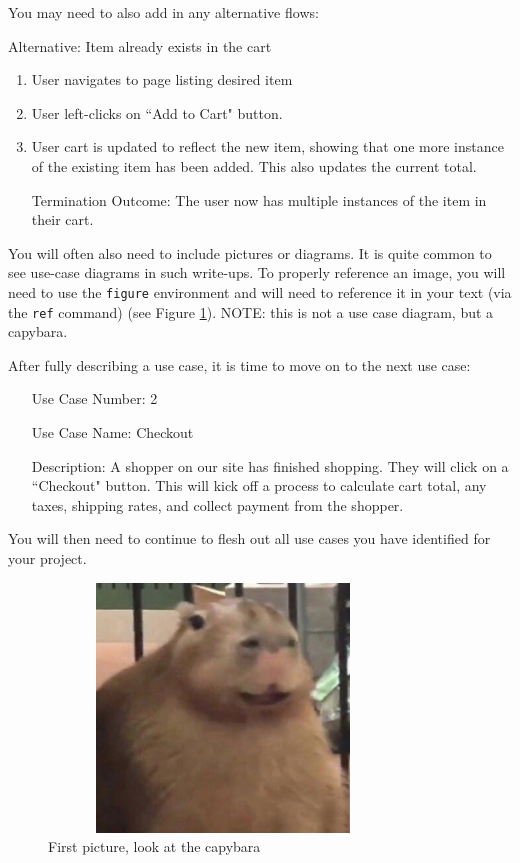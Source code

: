 \documentclass[10pt,conference,onecolumn,compsoc]{IEEEtran}
\begin{document}
You may need to also add in any alternative flows:

Alternative: Item already exists in the cart
\begin{enumerate}
\item User navigates to page listing desired item
\item User left-clicks on ``Add to Cart" button.
\item User cart is updated to reflect the new item, showing that one more instance of the existing item has been added.  This also updates the current total.
\item[Termination Outcome:] The user now has multiple instances of the item in their cart.
\end{enumerate}

You will often also need to include pictures or diagrams.  It is quite common to see use-case diagrams in such write-ups.  To properly reference an image, you will need to use the \texttt{figure} environment and will need to reference it in your text (via the \texttt{ref} command) (see Figure \ref{capybara1}).  NOTE: this is not a use case diagram, but a capybara.

After fully describing a use case, it is time to move on to the next use case:

\begin{itemize}
\item[Use Case Number:] 2
\item[Use Case Name:] Checkout
\item[Description:] A shopper on our site has finished shopping.  They will click on a ``Checkout" button.  This will kick off a process to calculate cart total, any taxes, shipping rates, and collect payment from the shopper.

\end{itemize}

You will then need to continue to flesh out all use cases you have identified for your project.

\begin{figure}[ht!]
\includegraphics[height=250px, width=350px]{capybara1.jpg}
\caption{First picture, look at the capybara}
\label{capybara1}
\end{figure}
\end{document}
